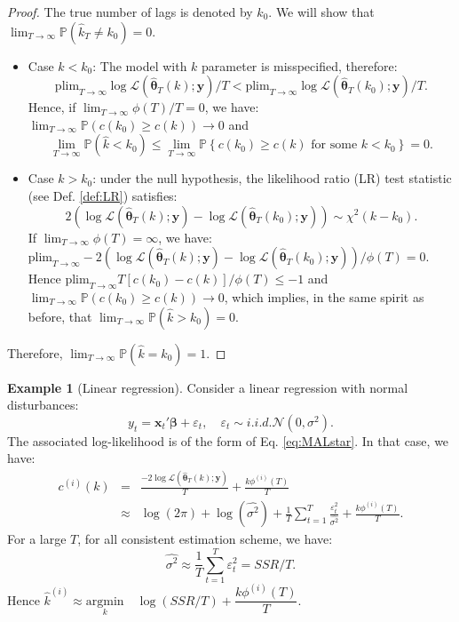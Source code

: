 \documentclass[
  12pt,
]{book}
\providecommand{\tightlist}{%
  \setlength{\itemsep}{0pt}\setlength{\parskip}{0pt}}
\theoremstyle{definition}
\theoremstyle{definition}
\newtheorem{example}{Example}[chapter]
\theoremstyle{definition}
\theoremstyle{definition}
\theoremstyle{remark}
\begin{document}
\begin{proof}
The true number of lags is denoted by \(k_0\). We will show that \(\lim_{T \rightarrow \infty} \mathbb{P}(\hat{k}_T \ne k_0)=0\).

\begin{itemize}
\tightlist
\item
  Case \(k < k_0\): The model with \(k\) parameter is misspecified, therefore:
  \[
  \mbox{plim}_{T \rightarrow \infty}  \log \mathcal{L}(\hat{\boldsymbol\theta}_T(k);\mathbf{y})/T < \mbox{plim}_{T \rightarrow \infty}  \log \mathcal{L}(\hat{\boldsymbol\theta}_T(k_0);\mathbf{y})/T.
  \]
  Hence, if \(\lim_{T \rightarrow \infty} \phi(T)/T = 0\), we have: \(\lim_{T \rightarrow \infty} \mathbb{P}(c(k_0) \ge c(k)) \rightarrow 0\) and
  \[
  \lim_{T \rightarrow \infty} \mathbb{P}(\hat{k}<k_0) \le \lim_{T \rightarrow \infty} \mathbb{P}\left\{c(k_0) \ge c(k) \mbox{ for some $k < k_0$}\right\} = 0.
  \]
\item
  Case \(k > k_0\): under the null hypothesis, the likelihood ratio (LR) test statistic (see Def. \ref{def:LR}) satisfies:
  \[
  2 \left(\log \mathcal{L}(\hat{\boldsymbol\theta}_T(k);\mathbf{y})-\log \mathcal{L}(\hat{\boldsymbol\theta}_T(k_0);\mathbf{y})\right) \sim \chi^2(k-k_0).
  \]
  If \(\lim_{T \rightarrow \infty} \phi(T) = \infty\), we have: \(\mbox{plim}_{T \rightarrow \infty} -2 \left(\log \mathcal{L}(\hat{\boldsymbol\theta}_T(k);\mathbf{y})-\log \mathcal{L}(\hat{\boldsymbol\theta}_T(k_0);\mathbf{y})\right)/\phi(T) = 0\). Hence \(\mbox{plim}_{T \rightarrow \infty} T[c(k_0) - c(k)]/\phi(T) \le -1\) and \(\lim_{T \rightarrow \infty} \mathbb{P}(c(k_0) \ge c(k)) \rightarrow 0\), which implies, in the same spirit as before, that \(\lim_{T \rightarrow \infty} \mathbb{P}(\hat{k}>k_0) = 0\).
\end{itemize}

Therefore, \(\lim_{T \rightarrow \infty} \mathbb{P}(\hat{k}=k_0) = 1\).
\end{proof}

\begin{example}[Linear regression]
\protect\hypertarget{exm:ICOLS}{}\label{exm:ICOLS}Consider a linear regression with normal disturbances:
\[
y_t = \mathbf{x}_t' \boldsymbol\beta + \varepsilon_t, \quad \varepsilon_t \sim i.i.d. \mathcal{N}(0,\sigma^2).
\]
The associated log-likelihood is of the form of Eq. \eqref{eq:MALstar}. In that case, we have:
\begin{eqnarray*}
c^{(i)}(k) &=& \frac{- 2 \log \mathcal{L}(\hat{\boldsymbol\theta}_T(k);\mathbf{y})}{T} + \frac{k\phi^{(i)}(T)}{T}\\
&\approx& \log(2\pi) + \log(\widehat{\sigma^2}) + \frac{1}{T}\sum_{t=1}^T \frac{\varepsilon_t^2}{\widehat{\sigma^2}} + \frac{k\phi^{(i)}(T)}{T}.
\end{eqnarray*}
For a large \(T\), for all consistent estimation scheme, we have:
\[
\widehat{\sigma^2} \approx \frac{1}{T}\sum_{t=1}^T \varepsilon_t^2 = SSR/T.
\]
Hence \(\hat{k}^{(i)} \approx \underset{k}{\mbox{argmin}} \quad \log(SSR/T) + \dfrac{k\phi^{(i)}(T)}{T}\).
\end{example}
\end{document}
